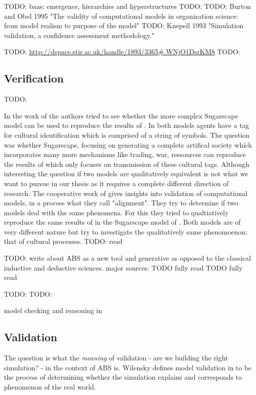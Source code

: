 TODO: baas: emergence, hierarchies and hyperstructures
TODO: \cite{baas_emergence_1997}
TODO: Burton and Obel 1995 "The validity of computational models in organization science: from model realism to purpose of the model"
TODO: Knepell 1993 "Simulation validation, a confidence assessment methodology."

TODO: \url{http://dspace.stir.ac.uk/handle/1893/3365#.WNjO1DsrKM8}
TODO: \cite{klugl_amason:_2013}

\subsection{Verification}
TODO: \cite{axelrod_advancing_1997}

In the work of \cite{axtell_aligning_1996} the authors tried to see whether the more complex Sugarscape model can be used to reproduce the results of \cite{axelrod_convergence_1995}. In both models agents have a tag for cultural identification which is comprised of a string of symbols. The question was whether Sugarscape, focusing on generating a complete artifical society which incorporates many more mechanisms like trading, war, ressources can reproduce the results of \cite{axelrod_convergence_1995} which only focuses on transmission of these cultural tags. Although interesting the question if two models are qualitatively equivalent is not what we want to pursue in our thesis as it requires a complete different direction of research.
The cooperative work of \cite{axtell_aligning_1996} gives insights into validation of computational models, in a process what they call "alignment". They try to determine if two models deal with the same phenomena. For this they tried to qualtiatively reproduce the same results of \cite{axelrod_convergence_1995} in the Sugarscape model of \cite{epstein_growing_1996}. Both models are of very different nature but try to investigate the qualitatively same phenomoenon: that of cultural processes. TODO: read

TODO: write about ABS as a new tool and  generative as opposed to the classical inductive and deductive sciences. major sources: 
TODO fully read \cite{epstein_chapter_2006}
TODO fully read \cite{epstein_generative_2012}

TODO: \cite{galan_errors_2009}
TODO: \cite{windrum_empirical_2007}

model checking and reasoning in \cite{hutton_tutorial_1999}\\

\subsection{Validation}
The question is what the \textit{meaning} of validation - are we building the right simulation? - in the context of ABS is. Wilensky defines model validation in \cite{wilensky_making_2007} to be the process of determining whether the simulation explains and corresponds to phenomenon of the real world.
